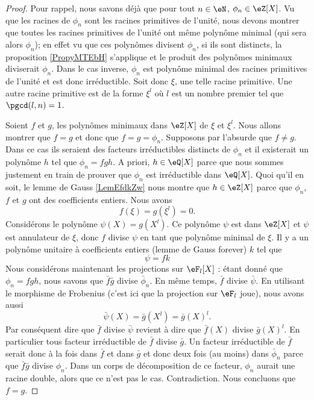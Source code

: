 \begin{proof}
    Pour rappel, nous savons déjà que pour tout \( n\in\eN\), \( \phi_n\in \eZ[X]\). Vu que les racines de \( \phi_n\) sont les racines primitives de l'unité, nous devons montrer que toutes les racines primitives de l'unité ont même polynôme minimal (qui sera alors \( \phi_n\)); en effet vu que ces polynômes divisent \( \phi_n\), si ils sont distincts, la proposition \ref{PropyMTEbH} s'applique et le produit des polynômes minimaux diviserait \( \phi_n\). Dans le cas inverse, \( \phi_n\) est polynôme minimal des racines primitives de l'unité et est donc irréductible. Soit donc \( \xi\), une telle racine primitive. Une autre racine primitive est de la forme \( \xi^l\) où \( l\) est un nombre premier tel que \( \pgcd(l,n)=1\).

    Soient \( f\) et \( g\), les polynômes minimaux dans \( \eZ[X]\) de \( \xi\) et \( \xi^l\). Nous allons montrer que \( f=g\) et donc que \( f=g=\phi_n\). Supposons par l'absurde que \( f\neq g\). Dans ce cas ils seraient des facteurs irréductibles distincts de \( \phi_n\) et il existerait un polynôme \( h\) tel que \( \phi_n=fgh\). A priori, \( h\in \eQ[X]\) parce que nous sommes justement en train de prouver que \( \phi_n\) est irréductible dans \( \eQ[X]\). Quoi qu'il en soit, le lemme de Gauss \ref{LemEfdkZw} nous montre que \( h\in \eZ[X]\) parce que \( \phi_n\), \( f\) et \( g\) ont des coefficients entiers. Nous avons
    \begin{equation}
        f(\xi)=g(\xi^l)=0.
    \end{equation}
    Considérons le polynôme \( \psi(X)=g(X^l)\). Ce polynôme \( \psi\) est dans \( \eZ[X]\) et \( \psi\) est annulateur de \( \xi\), donc \( f\) divise \( \psi\) en tant que polynôme minimal de \( \xi\). Il y a un polynôme unitaire à coefficients entiers (lemme de Gauss forever) \( k\) tel que
    \begin{equation}
        \psi=fk
    \end{equation}
    Nous considérons maintenant les projections sur \( \eF_l[X]\) : étant donné que \( \phi_n=fgh\), nous savons que \( \bar f\bar g\) divise \( \bar\phi_n\). En même temps, \( \bar f\) divise \( \bar \psi\). En utilisant le morphisme de Frobenius (c'est ici que la projection sur \( \eF_l\) joue), nous avons aussi
    \begin{equation}
        \bar\psi(X)=\bar g(X^l)=\bar g(X)^l.
    \end{equation}
    Par conséquent dire que \( \bar f\) divise \( \bar\psi\) revient à dire que \( \bar f(X)\) divise \( \bar g(X)^l\). En particulier tous facteur irréductible de \( \bar f\) divise \( \bar g\). Un facteur irréductible de \( \bar f\) serait donc à la fois dans \( \bar f\) et dans \( \bar g\) et donc deux fois (au moins) dans \( \bar\phi_n\) parce que \( \bar f\bar g\) divise \( \phi_n\). Dans un corps de décomposition de ce facteur, \( \phi_n\) aurait une racine double, alors que ce n'est pas le cas. Contradiction. Nous concluons que \( f=g\).
\end{proof}

